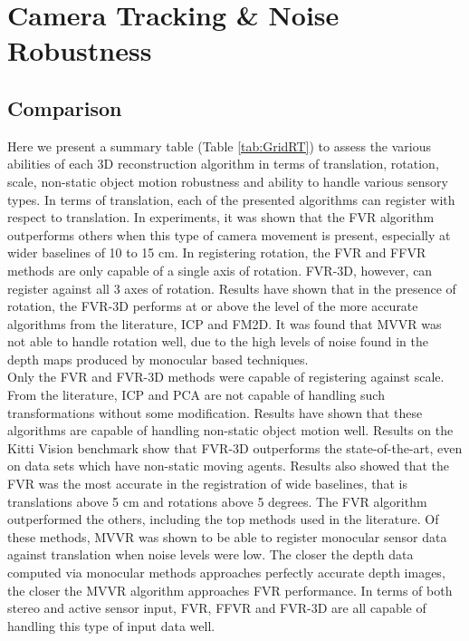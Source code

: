 \section{Camera Tracking \& Noise Robustness}
\label{Sec:CamTransTrackExp}


\subsection{Comparison}

Here we present a summary table (Table \ref{tab:GridRT}) to assess the various abilities of each 3D reconstruction algorithm in terms of translation, rotation, scale, non-static object motion robustness and ability to handle various sensory types. In terms of translation, each of the presented algorithms can register with respect to translation. In experiments, it was shown that the FVR algorithm outperforms others when this type of camera movement is present, especially at wider baselines of 10 to 15 cm. In registering rotation, the FVR and FFVR methods are only capable of a single axis of rotation. FVR-3D, however, can register against all 3 axes of rotation. Results have shown that in the presence of rotation, the FVR-3D performs at or above the level of the more accurate algorithms from the literature, ICP and FM2D. It was found that MVVR was not able to handle rotation well, due to the high levels of noise found in the depth maps produced by monocular based techniques. \\

Only the FVR and FVR-3D methods were capable of registering against scale. From the literature, ICP and PCA are not capable of handling such transformations without some modification. Results have shown that these algorithms are capable of handling non-static object motion well. Results on the Kitti Vision benchmark show that FVR-3D outperforms the state-of-the-art, even on data sets which have non-static moving agents. Results also showed that the FVR was the most accurate in the registration of wide baselines, that is translations above 5 cm and rotations above 5 degrees. The FVR algorithm outperformed the others, including the top methods used in the literature. Of these methods, MVVR was shown to be able to register monocular sensor data against translation when noise levels were low. The closer the depth data computed via monocular methods approaches perfectly accurate depth images, the closer the MVVR algorithm approaches FVR performance. In terms of both stereo and active sensor input, FVR, FFVR and FVR-3D are all capable of handling this type of input data well. \\


